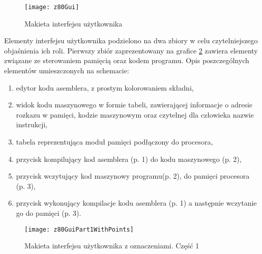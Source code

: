 	\begin{figure}[h]
		\centering
		\texttt{[image: z80Gui]}
		\caption{Makieta interfejsu użytkownika}
		\label{img:z80Gui}
	\end{figure}
	 
	
	Elementy interfejsu użytkownika podzielono na dwa zbiory w celu czytelniejszego objaśnienia ich roli. Pierwszy zbiór zaprezentowany na grafice \ref{img:z80GuiPart1WithPoints} zawiera elementy związane ze sterowaniem pamięcią oraz kodem programu. Opis poszczególnych elementów umieszczonych na schemacie:
	\begin{enumerate}
		\item edytor kodu asemblera, z prostym kolorowaniem składni,
		\item widok kodu maszynowego w formie tabeli, zawierającej informacje o adresie rozkazu w pamięci, kodzie maszynowym oraz czytelnej dla człowieka nazwie instrukcji,
		\item tabela reprezentująca moduł pamięci podłączony do procesora,
		\item przycisk kompilujący kod asemblera (p. 1) do kodu maszynowego (p. 2),
		\item przycisk wczytujący kod maszynowy programu(p. 2), do pamięci procesora (p. 3),
		\item przycisk wykonujący kompilacje kodu asemblera (p. 1) a następnie wczytanie go do pamięci (p. 3).
	\end{enumerate}
	
	\begin{figure}[h]
		\centering
		\texttt{[image: z80GuiPart1WithPoints]}
		\caption{Makieta interfejsu użytkownika z oznaczeniami. Część 1}
		\label{img:z80GuiPart1WithPoints}
	\end{figure}
	
